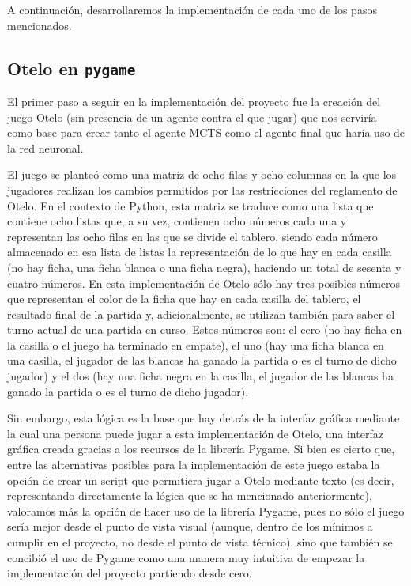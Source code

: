 \documentclass[conference]{IEEEtran}
\begin{document}
A continuación, desarrollaremos la implementación de cada uno de los pasos mencionados.

\subsection{Otelo en \texttt{pygame}}
El primer paso a seguir en la implementación del proyecto fue la creación del juego Otelo (sin presencia de un agente contra el que jugar) que nos serviría como base para crear tanto el agente MCTS como el agente final que haría uso de la red neuronal.

El juego se planteó como una matriz de ocho filas y ocho columnas en la que los jugadores realizan los cambios permitidos por las restricciones del reglamento de Otelo. En el contexto de Python, esta matriz se traduce como una lista que contiene ocho listas que, a su vez, contienen ocho números cada una y representan las ocho filas en las que se divide el tablero, siendo cada número almacenado en esa lista de listas la representación de lo que hay en cada casilla (no hay ficha, una ficha blanca o una ficha negra), haciendo un total de sesenta y cuatro números. En esta implementación de Otelo sólo hay tres posibles números que representan el color de la ficha que hay en cada casilla del tablero, el resultado final de la partida y, adicionalmente, se utilizan también para saber el turno actual de una partida en curso. Estos números son: el cero (no hay ficha en la casilla o el juego ha terminado en empate), el uno (hay una ficha blanca en una casilla, el jugador de las blancas ha ganado la partida o es el turno de dicho jugador) y el dos (hay una ficha negra en la casilla, el jugador de las blancas ha ganado la partida o es el turno de dicho jugador).

Sin embargo, esta lógica es la base que hay detrás de la interfaz gráfica mediante la cual una persona puede jugar a esta implementación de Otelo, una interfaz gráfica creada gracias a los recursos de la librería Pygame. Si bien es cierto que, entre las alternativas posibles para la implementación de este juego estaba la opción de crear un script que permitiera jugar a Otelo mediante texto (es decir, representando directamente la lógica que se ha mencionado anteriormente), valoramos más la opción de hacer uso de la librería Pygame, pues no sólo el juego sería mejor desde el punto de vista visual (aunque, dentro de los mínimos a cumplir en el proyecto, no desde el punto de vista técnico), sino que también se concibió el uso de Pygame como una manera muy intuitiva de empezar la implementación del proyecto partiendo desde cero.
\end{document}

